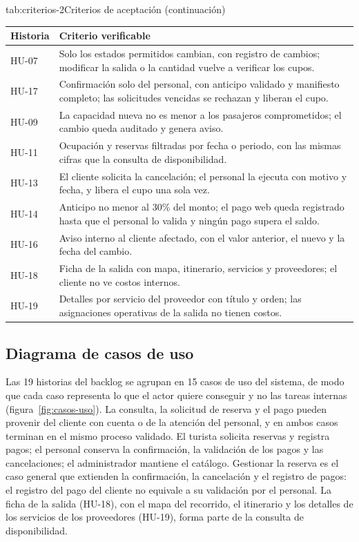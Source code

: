 \begin{tablaapa}{tab:criterios-2}{Criterios de aceptación (continuación)}
\small
\begin{tabular}{@{}p{1.3cm}p{13cm}@{}}
\toprule
Historia & Criterio verificable \\
\midrule
HU-07 & Solo los estados permitidos cambian, con registro de cambios;
modificar la salida o la cantidad vuelve a verificar los cupos. \\
HU-17 & Confirmación solo del personal, con anticipo validado y manifiesto
completo; las solicitudes vencidas se rechazan y liberan el cupo. \\
HU-09 & La capacidad nueva no es menor a los pasajeros comprometidos; el
cambio queda auditado y genera aviso. \\
HU-11 & Ocupación y reservas filtradas por fecha o periodo, con las mismas
cifras que la consulta de disponibilidad. \\
HU-13 & El cliente solicita la cancelación; el personal la ejecuta con
motivo y fecha, y libera el cupo una sola vez. \\
HU-14 & Anticipo no menor al 30\% del monto; el pago web queda registrado
hasta que el personal lo valida y ningún pago supera el saldo. \\
HU-16 & Aviso interno al cliente afectado, con el valor anterior, el nuevo y
la fecha del cambio. \\
HU-18 & Ficha de la salida con mapa, itinerario, servicios y proveedores; el
cliente no ve costos internos. \\
HU-19 & Detalles por servicio del proveedor con título y orden; las
asignaciones operativas de la salida no tienen costos. \\
\bottomrule
\end{tabular}
\end{tablaapa}

\subsection{Diagrama de casos de uso}

Las 19 historias del backlog se agrupan en 15 casos de uso del sistema, de
modo que cada caso representa lo que el actor quiere conseguir y no las
tareas internas (figura~\ref{fig:casos-uso}). La consulta, la solicitud de
reserva y el pago pueden provenir del cliente con cuenta o de la atención del
personal, y en ambos casos terminan en el mismo proceso validado. El turista
solicita reservas y registra pagos; el personal conserva la confirmación, la
validación de los pagos y las cancelaciones; el administrador mantiene el
catálogo. Gestionar la reserva es el caso general que extienden la
confirmación, la cancelación y el registro de pagos: el registro del pago del
cliente no equivale a su validación por el personal. La ficha de la salida
(HU-18), con el mapa del recorrido, el itinerario y los detalles de los
servicios de los proveedores (HU-19), forma parte de la consulta de
disponibilidad.

